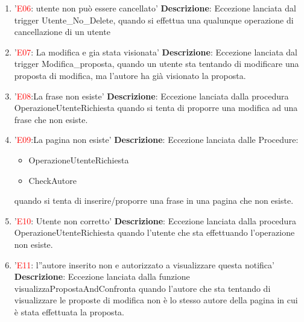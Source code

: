 \begin{enumerate}[label=\textbf{\arabic*.}]
    \item '\textcolor{red}{E06}: utente non può essere cancellato'\newline\newline
    \textbf{Descrizione}: Eccezione lanciata dal trigger Utente\_No\_Delete, quando si effettua una qualunque operazione di cancellazione di un utente
    
    \item '\textcolor{red}{E07}: La modifica e gia stata visionata'\newline\newline
    \textbf{Descrizione}: Eccezione lanciata dal trigger Modifica\_proposta, quando un utente sta tentando di modificare una proposta di modifica, ma l'autore ha già visionato la proposta.

    \item '\textcolor{red}{E08}:La frase non esiste'\newline\newline
    \textbf{Descrizione}: Eccezione lanciata dalla procedura OperazioneUtenteRichiesta quando si tenta di proporre una modifica ad una frase che non esiste.

    \item '\textcolor{red}{E09}:La pagina non esiste' \newline\newline
    \textbf{Descrizione}: Eccezione lanciata dalle Procedure:
    \begin{itemize}
        \item OperazioneUtenteRichiesta
        \item CheckAutore
    \end{itemize}
    quando si tenta di inserire/proporre una frase in una pagina che non esiste.

    \item '\textcolor{red}{E10}: Utente non corretto' \newline\newline
    \textbf{Descrizione}: Eccezione lanciata dalla procedura OperazioneUtenteRichiesta quando l'utente che sta effettuando l'operazione non esiste.

    \item '\textcolor{red}{E11}: l''autore inserito non e autorizzato a visualizzare questa notifica'\newline\newline
    \textbf{Descrizione}: Eccezione lanciata dalla funzione visualizzaPropostaAndConfronta quando l'autore che sta tentando di visualizzare le proposte di modifica non è lo stesso autore della pagina in cui è stata effettuata la proposta.


\end{enumerate}
